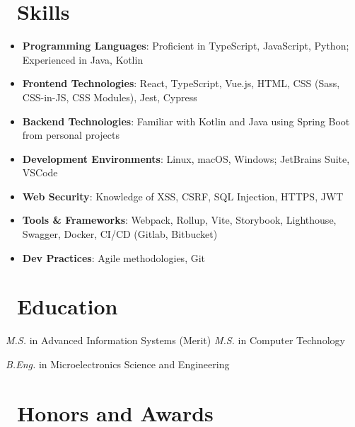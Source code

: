 \documentclass{resume}
\begin{document}

\section{\faCogs\ Skills}
\begin{itemize}[parsep=0.5ex]
  \item \textbf{Programming Languages}: Proficient in TypeScript, JavaScript, Python; Experienced in Java, Kotlin
  \item \textbf{Frontend Technologies}: React, TypeScript, Vue.js, HTML, CSS (Sass, CSS-in-JS, CSS Modules), Jest, Cypress
  \item \textbf{Backend Technologies}: Familiar with Kotlin and Java using Spring Boot from personal projects
  \item \textbf{Development Environments}: Linux, macOS, Windows; JetBrains Suite, VSCode
  \item \textbf{Web Security}: Knowledge of XSS, CSRF, SQL Injection, HTTPS, JWT
  \item \textbf{Tools \& Frameworks}: Webpack, Rollup, Vite, Storybook, Lighthouse, Swagger, Docker, CI/CD (Gitlab, Bitbucket)
  \item \textbf{Dev Practices}: Agile methodologies, Git
\end{itemize}

\section{\faGraduationCap\ Education}
\textit{M.S.} in Advanced Information Systems (Merit)
\textit{M.S.} in Computer Technology

\textit{B.Eng.} in Microelectronics Science and Engineering

\section{\faHeartO\ Honors and Awards}
\end{document}
